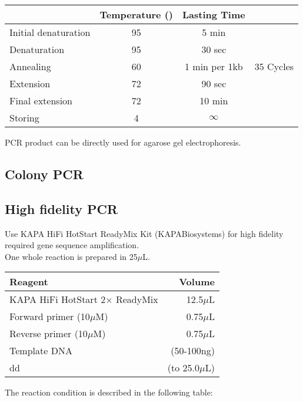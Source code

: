 \begin{tabular}[H]{l c c  c}
	\hline
	~~~ & \textsf{\textbf{Temperature (\textcelsius)}} &  \textsf{\textbf{Lasting Time}}  &\\
	\hline
	Initial denaturation &  95 &  5 min  &\\
	\hline
	Denaturation  &  95 &  30 sec  & \multirow{3}{*}{35 Cycles} \\
	Annealing &  60 &  1 min per 1kb  & \\
	Extension &  72 & 90 sec &\\
	\hline
	Final extension &  72 & 10 min &\\
	Storing &  4 & $\infty$ &\\
	\hline
\end{tabular}
\linebreak
\linebreak
PCR product can be directly used for agarose gel electrophoresis. 
\subsection{Colony PCR}

\subsection{High fidelity PCR}
Use KAPA HiFi HotStart ReadyMix Kit (KAPABiosystems) for high fidelity required gene sequence amplification. \\
One whole reaction is prepared in 25$\mu$L. \\

\begin{tabular}{l r} 
	\hline
	\textsf{\textbf{Reagent}} & \textsf{\textbf{Volume}} \\
	\hline
	KAPA HiFi HotStart 2$\times$ ReadyMix & 12.5$\mu$L \\
	Forward primer (10$\mu$M) & 0.75$\mu$L \\
	Reverse primer (10$\mu$M) & 0.75$\mu$L \\
	Template DNA & (50-100ng)  \\
	dd\ce{H2O} & (to 25.0$\mu$L)\\
	\hline
\end{tabular}
\linebreak
\linebreak
The reaction condition is described in the following table: \\

